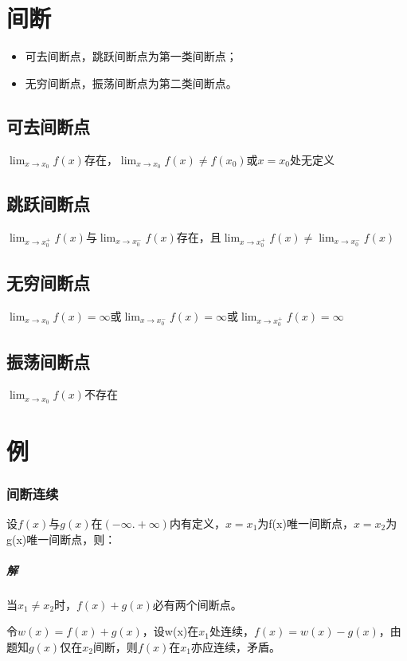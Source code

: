 \section{间断}
\begin{itemize}
    \item 可去间断点，跳跃间断点为第一类间断点；
    \item 无穷间断点，振荡间断点为第二类间断点。
\end{itemize}

\subsection{可去间断点}
\(\displaystyle \lim_{x \to x_0}f(x)\)存在，\(\displaystyle \lim_{x \to x_0}f(x) \neq f(x_0)\)或\(x = x_0\)处无定义

\subsection{跳跃间断点}
\(\displaystyle \lim_{x \to x_0^+}f(x)\)与\(\displaystyle \lim_{x \to x_0^-}f(x)\)存在，且\(\displaystyle \lim_{x \to x_0^+}f(x) \neq \displaystyle \lim_{x \to x_0^-}f(x)\)

\subsection{无穷间断点}
\(\displaystyle \lim_{x \to x_0}f(x) = \infty\)或\(\displaystyle \lim_{x \to x_0^-}f(x) = \infty\)或\(\displaystyle \lim_{x \to x_0^+}f(x) = \infty\)

\subsection{振荡间断点}
\(\displaystyle \lim_{x \to x_0}f(x)\)不存在


\section{例}

\subsubsection{间断连续}
设\(f(x)\)与\(g(x)\)在\((-\infty. +\infty)\)内有定义，\(x = x_1\)为f(x)唯一间断点，\(x = x_2\)为g(x)唯一间断点，则：
\subparagraph{解}
当\(x_1 \neq x_2\)时，\(f(x) + g(x)\)必有两个间断点。

令\(w(x) = f(x) + g(x)\)，设w(x)在\(x_1\)处连续，\(f(x) = w(x) - g(x)\)，由题知\(g(x)\)仅在\(x_2\)间断，则\(f(x)\)在\(x_1\)亦应连续，矛盾。







